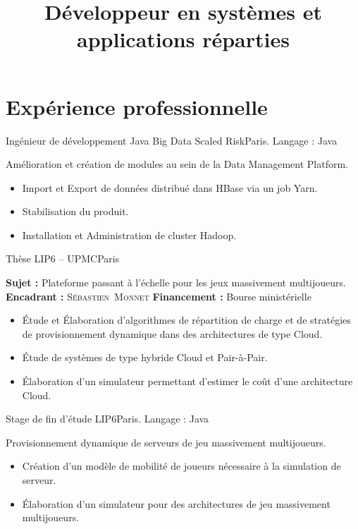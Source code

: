 \documentclass[11pt,a4paper,sans]{moderncv}
\title{Développeur en systèmes et applications réparties}
\begin{document}
\makecvtitle %
\vspace*{-0.5cm}


\section{Expérience professionnelle}
\vspace{1em}

        {Ingénieur de développement Java Big Data}
        {Scaled Risk}{Paris. Langage : Java}{}
        {
            Amélioration et création de modules au sein de la Data Management Platform.
            \begin{itemize}
                \item Import et Export de données distribué dans HBase via un job Yarn.
                \item Stabilisation du produit.
                \item Installation et Administration de cluster Hadoop.
            \end{itemize}
        }

\vspace{1em}

        {Thèse}
        {LIP6 -- UPMC}{Paris}{}
        {
            \textbf{Sujet :} Plateforme passant à l'échelle pour les jeux massivement multijoueurs.\endgraf
            \textbf{Encadrant :} \textsc{Sébastien~Monnet}\hfill
            \textbf{Financement :} Bourse ministérielle\hfill~\endgraf
            \begin{itemize}
                \item\'Etude et \'Elaboration d'algorithmes de répartition de charge et de stratégies de provisionnement dynamique dans des architectures de type Cloud.
                \item\'Etude de systèmes de type hybride Cloud et Pair-à-Pair.
                \item\'Elaboration d'un simulateur permettant d'estimer le coût d'une architecture Cloud.
            \end{itemize}
        }

\vspace{1em}

        {Stage de fin d'étude}
        {LIP6}{Paris. Langage : Java}{}
        {
            Provisionnement dynamique de serveurs de jeu massivement multijoueurs.
            \begin{itemize}
                \item Création d'un modèle de mobilité de joueurs nécessaire à la simulation de serveur.
                \item\'Elaboration d'un simulateur pour des architectures de jeu massivement multijoueurs.
            \end{itemize}
        }
\end{document}
